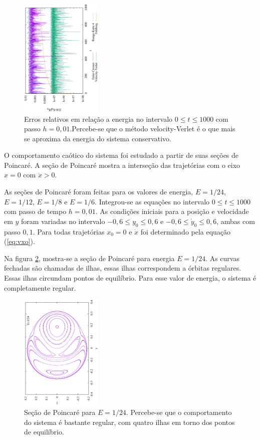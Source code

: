 \documentclass[brazilian, 10pt, a4paper, final]{article}
\begin{document}
\begin{multicols*}{2}
\begin{figure}[H]
  \centering
  \includegraphics[width=0.35\textwidth,angle=-90]{MetodosE.eps}
  \caption{Erros relativos em relação a energia no intervalo $0 \le t\le 1000$ com passo $h=0,01$.Percebe-se que o método velocity-Verlet é o que mais se aproxima da energia do sistema conservativo.}
  \label{fig:erros}
\end{figure}


O comportamento caótico do sistema foi estudado a partir de suas seções de Poincaré. A seção de Poincaré mostra a interseção das trajetórias com o eixo $x=0$ com $\dot{x}>0$. 

As seções de Poincaré foram feitas para os valores de energia, $E=1/24$, $E=1/12$, $E=1/8$ e $E=1/6$. Integrou-se as equações no intervalo $0 \le t \le 1000$ com passo de tempo $h=0,01$. As condições iniciais para a posição e velocidade em $y$ foram variadas no intervalo $-0,6 \le y_0 \le 0,6$ e $-0,6 \le \dot{y}_0 \le 0,6$, ambas com passo $0,1$. Para todas trajetórias $x_0=0$ e $\dot{x}$ foi determinado pela equação (\ref{eq:vxo}).

Na figura \ref{fig:E24}, mostra-se a seção de Poincaré para energia $E=1/24$. As curvas fechadas são chamadas de ilhas, essas ilhas correspondem a órbitas regulares. Essas ilhas circundam pontos de equilíbrio. Para esse valor de energia, o sistema é completamente regular.

\begin{figure}[H]
  \centering
  \includegraphics[width=0.35\textwidth,angle=-90]{P004167.eps}
  \caption{Seção de Poincaré para $E=1/24$. Percebe-se que o comportamento do sistema é bastante regular, com quatro ilhas em torno dos pontos de equilíbrio.}
  \label{fig:E24}
\end{figure}


\end{multicols*}
\end{document}
